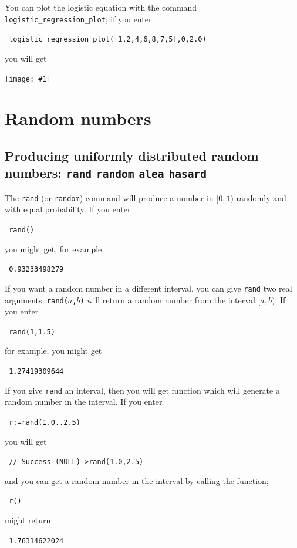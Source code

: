 \documentclass[a4paper,11pt]{book}
\newcommand{\includeimage}[1]
{\texttt{[image: \#1]}}
\begin{document}
You can plot the logistic equation with the command
\texttt{logistic\_regression\_plot}; if you enter
\begin{center}
  \tt
  logistic\_regression\_plot([1,2,4,6,8,7,5],0,2.0)
\end{center}
you will get
\begin{center}
  \includeimage{xcas-logisticregplot.png}
\end{center}

\section{Random numbers}

\subsection{Producing uniformly distributed random numbers: \texttt{rand} \texttt{random} \texttt{alea} \texttt{hasard}}

The \texttt{rand} (or \texttt{random}) command will produce a number in
$[0,1)$ randomly and with equal probability.  If you enter
\begin{center}
  \tt
  rand()
\end{center}
you might get, for example,
\begin{center}
  \tt
  0.93233498279
\end{center}

If you want a random number in a different interval, you can give
\texttt{rand} two real arguments; \texttt{rand($a$,$b$)} will return a
random number from the interval $[a,b)$.  If you enter
\begin{center}
  \tt
  rand(1,1.5)
\end{center}
for example, you might get
\begin{center}
  \tt
  1.27419309644
\end{center}
If you give \texttt{rand} an interval, then you will get function
which will generate a random number in the interval.  If you enter
\begin{center}
  \tt
  r:=rand(1.0..2.5)
\end{center}
you will get
\begin{center}
  \tt
  // Success
 (NULL)->rand(1.0,2.5)
\end{center}
and you can get a random number in the interval by calling the function;
\begin{center}
  \tt
  r()
\end{center}
might return
\begin{center}
  \tt
  1.76314622024
\end{center}
\end{document}

